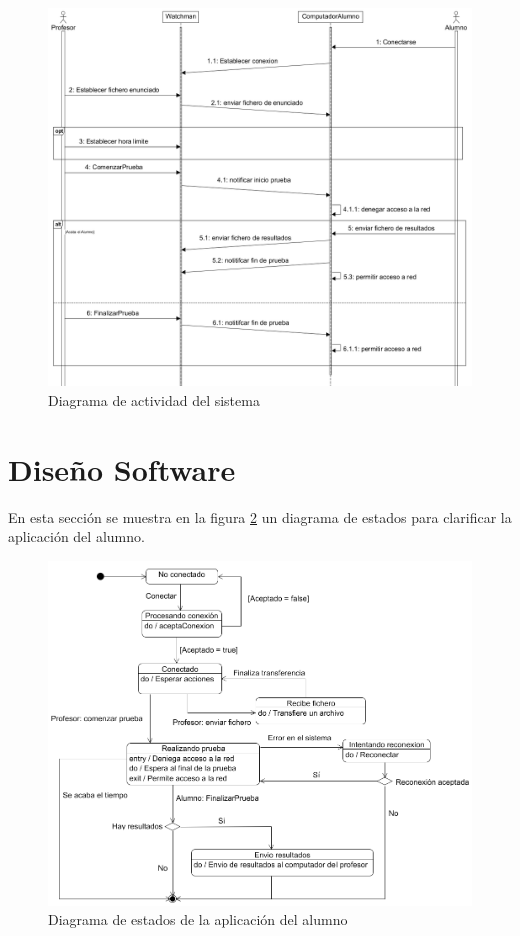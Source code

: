 \begin{figure}
    \centering
    \includegraphics[width=\linewidth]{arquitectura/actividadSistema}
    \caption{Diagrama de actividad del sistema}
    \label{fig:arquitectura:actividadSistema}
\end{figure}

\section{Diseño Software}
\label{sec:arquitectura:diseno}

En esta sección se muestra en la figura \ref{fig:arquitectura:estadosAlumno} un diagrama de estados para clarificar la aplicación del alumno.
\newline


\begin{figure}
    \centering
    \includegraphics[width=\linewidth]{arquitectura/estadosAlumno}
    \caption{Diagrama de estados de la aplicación del alumno}
    \label{fig:arquitectura:estadosAlumno}
\end{figure}



